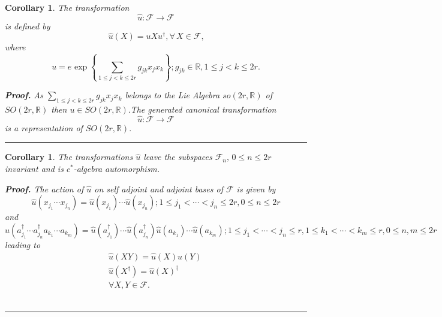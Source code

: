 \documentclass[aps, preprint]{revtex4}
\newtheorem{corollary}[theorem]{Corollary}
\newenvironment{proof}[1][Proof]{\noindent\textbf{#1.} }{\ \rule{0.5em}{0.5em}}
\begin{document}
\begin{corollary}
The transformation
\begin{equation}\widehat{u} :\mathcal{F} \rightarrow \mathcal{F}
\end{equation}is defined by
\begin{equation}\widehat{u} \left (X\right ) =u X u^{ \dag } , \forall \,X \in \mathcal{F}\text{,}
\end{equation}where
\begin{equation}u =e^{{}} \exp  \left \{ \sum _{1 \leq j <k \leq 2 r}g_{j k} x_{j} x_{k}\right \} ;g_{j k} \in \mathbb{R} ,1 \leq j <k \leq 2 r\text{.}
\end{equation}


\begin{proof}
As $ \sum _{1 \leq j <k \leq 2 r}g_{j k} x_{j} x_{k}$ belongs to the Lie Algebra $s o \left (2 r ,\mathbb{R}\right )$ of $S O \left (2 r ,\mathbb{R}\right )$ then $u \in S O \left (2 r ,\mathbb{R}\right )\text{.}$The generated canonical transformation
\begin{equation}\widehat{u} :\mathcal{F} \rightarrow \mathcal{F}
\end{equation}is a representation of $S O \left (2 r ,\mathbb{R}\right )\text{.}$ 
\end{proof}


\end{corollary}


\begin{corollary}
The transformations $\widehat{u}$ leave the subspaces $\mathcal{F}_{n} ,\,0 \leq n \leq 2 r$ invariant and is $c^{ \ast }$-algebra automorphism. 


\begin{proof}
The action of $\widehat{u}$ on self adjoint and adjoint bases of $\mathcal{F}$ is given by
\begin{equation}\widehat{u} \left (x_{j_{1}} \cdots  x_{j_{n}}\right ) =\widehat{u} \left (x_{j_{1}}\right ) \cdots  \widehat{u} \left (x_{j_{n}}\right ) ;1 \leq j_{1} <\cdots  <j_{n} \leq 2 r ,0 \leq n \leq 2 r
\end{equation}and
\begin{equation}\widehat{u} \left (a_{j_{1}}^{ \dag } \cdots  a_{j_{n}}^{ \dag } a_{k_{1}} \cdots  a_{k_{m}}\right ) =\widehat{u} \left (a_{j_{1}}^{ \dag }\right ) \cdots  \widehat{u} \left (a_{j_{n}}^{ \dag }\right ) \widehat{u} \left (a_{k_{1}}\right ) \cdots  \widehat{u} \left (a_{k_{m}}\right ) ;1 \leq j_{1} <\cdots  <j_{n} \leq r ,1 \leq k_{1} <\cdots  <k_{m} \leq r ,0 \leq n ,m \leq 2 r
\end{equation}leading to
\begin{gather}\widehat{u} \left (X Y\right ) =\widehat{u} \left (X\right ) \widehat{u} \left (Y\right )\, \\
\widehat{u} \left (X^{ \dag }\right ) =\widehat{u} \left (X\right )^{ \dag } \\
 \forall X ,Y \in \mathcal{F}\text{.}\end{gather}
\end{proof}


\end{corollary}
\end{document}
